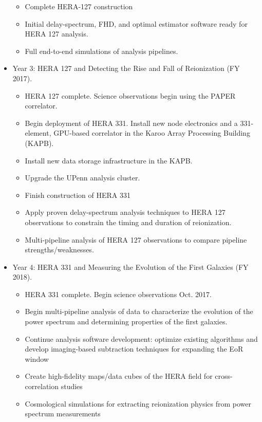 \documentclass[preprint]{aastex}
\begin{document}
\begin{itemize}[noitemsep,nolistsep]
\begin{itemize}[noitemsep,nolistsep]
\item Complete HERA-127 construction
\item Initial delay-spectrum, FHD, and optimal estimator software ready for HERA 127 analysis.
\item Full end-to-end simulations of analysis pipelines.
\end{itemize}
\item{Year 3:} HERA 127 and Detecting the Rise and Fall of Reionization (FY 2017).  
\begin{itemize}[noitemsep,nolistsep]
\item HERA 127 complete. Science observations begin using the PAPER correlator.
\item Begin deployment of HERA 331. Install new node electronics and a 331-element, GPU-based correlator in the Karoo Array Processing Building (KAPB).
\item Install new data storage infrastructure in the KAPB.
\item Upgrade the UPenn analysis cluster.
\item Finish construction of HERA 331
\item Apply proven delay-spectrum analysis techniques to HERA 127 observations to constrain the timing and duration of reionization.
\item Multi-pipeline analysis of HERA 127 observations to compare pipeline strengths/weaknesses.
\end{itemize}
\item{Year 4:} HERA 331 and Measuring the Evolution of the First Galaxies (FY 2018).           
\begin{itemize}[noitemsep,nolistsep]
\item HERA 331 complete. Begin science observations Oct. 2017.\item Begin multi-pipeline analysis of data to characterize the evolution of the power spectrum and determining properties of the first galaxies. 
\item Continue analysis software development: optimize existing algorithms and develop imaging-based subtraction techniques for expanding the EoR window
\item Create high-fidelity maps/data cubes of the HERA field for cross-correlation studies
\item Cosmological simulations for extracting reionization physics from power spectrum measurements
\end{itemize}
\end{itemize}
\end{document}
